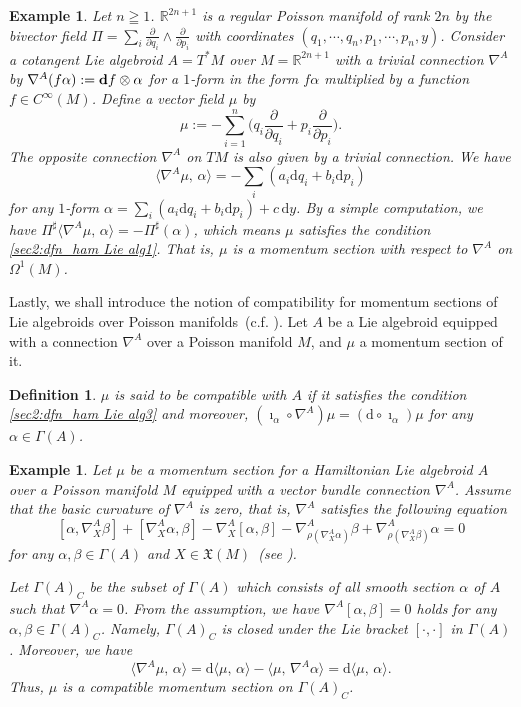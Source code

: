 \documentclass[a4paper,11pt,dvipdfmx]{article}
\newtheorem{dfn}[thm]{Definition}
\newtheorem{ex}[thm]{Example}
\numberwithin{equation}{section}
\begin{document}
\begin{ex}
Let $n\geqq 1$. 
$\mathbb{R}^{2n+1}$ is a regular Poisson manifold of rank $2n$ by the bivector field $\Pi=\sum_i\frac{\partial}{\partial q_i}\wedge \frac{\partial}{\partial p_i}$ with coordinates 
$(q_1,\cdots,q_n, p_1,\cdots,p_n, y)$. Consider a cotangent Lie algebroid $A=T^*M$ over $M=\mathbb{R}^{2n+1}$ with a trivial connection $\nabla^A$ by 
$\nabla^A(f\alpha):=\mathrm{\bf d}f\otimes \alpha$ for a $1$-form in the form $f\alpha$ multiplied by a function $f\in C^{\infty}(M)$. 
Define a vector field $\mu$ by 
\[
\mu:= -\sum_{i=1}^n\biggl(q_i\frac{\partial}{\partial q_i}+p_i\frac{\partial}{\partial p_i}\biggr).
\] 
The opposite connection $\nabla^{A}$ on $TM$ is also given by a trivial connection. We have 
\[
\langle \nabla^A\mu,\,\alpha\rangle = -\sum_i(a_i\mathrm{d}q_i+ b_i\mathrm{d}p_i)
\]
for any $1$-form $\alpha=\sum_i(a_i\mathrm{d}q_i+b_i\mathrm{d}p_i)+c\,\mathrm{d}y$. 
By a simple computation, we have $\Pi^{\sharp}\langle \nabla^A\mu,\,\alpha\rangle=-\Pi^{\sharp}(\alpha)$, which means $\mu$ satisfies the condition \eqref{sec2:dfn_ham Lie alg1}. 
That is, $\mu$ is a momentum section with respect to $\nabla^A$ on $\Omega^1(M)$. 
\end{ex}
\bigskip 

Lastly, we shall introduce the notion of compatibility for momentum sections of Lie algebroids over Poisson manifolds~(c.f. \cite{HIgeo24}). 
Let $A$ be a Lie algebroid equipped with a connection $\nabla^A$ over a Poisson manifold $M$, and $\mu$ a momentum section of it. 

\begin{dfn}\label{sec2:dfn_compatibility}
$\mu$ is said to be compatible with $A$ if it satisfies the condition \eqref{sec2:dfn_ham Lie alg3} and moreover, 
$(\imath_{\alpha}\circ\nabla^A)\mu = (\mathrm{d}\circ\imath_{\alpha})\mu$ for any $\alpha\in\varGamma(A)$. 
\end{dfn}

\begin{ex}
Let $\mu$ be a momentum section for a Hamiltonian Lie algebroid $A$ over a Poisson manifold $M$ equipped with a vector bundle connection $\nabla^A$. 
Assume that the basic curvature of $\nabla^A$ is zero, that is, $\nabla^A$ satisfies the following equation 
\[
[\alpha,\nabla^A_X\beta] + [\nabla^A_X\alpha,\beta]-\nabla^A_X[\alpha,\beta] -\nabla^A_{\rho(\nabla^A_X\alpha)}\beta + \nabla^A_{\rho(\nabla^A_X\beta)}\alpha=0 
\]
for any $\alpha,\beta\in \varGamma(A)$ and $X\in \mathfrak{X}(M)$~{\rm (}see \cite{Bgeo06, HIcom24}{\rm )}. 

Let $\varGamma(A)_C$ be the subset of $\varGamma(A)$ which consists of all smooth section $\alpha$ of $A$ such that $\nabla^A\alpha=0$. 
From the assumption, we have $\nabla^A[\alpha,\beta]=0$ holds for any $\alpha,\beta\in \varGamma(A)_C$. Namely, $\varGamma(A)_C$ is closed under the Lie bracket $[\cdot,\cdot]$ in $\varGamma(A)$. 
Moreover, we have
\[
\langle \nabla^A\mu,\,\alpha\rangle = \mathrm{d}\langle\mu,\,\alpha\rangle - \langle\mu,\,\nabla^A\alpha\rangle = \mathrm{d}\langle\mu,\,\alpha\rangle. 
\]
Thus, $\mu$ is a compatible momentum section on $\varGamma(A)_C$. 
\end{ex}
\end{document}
